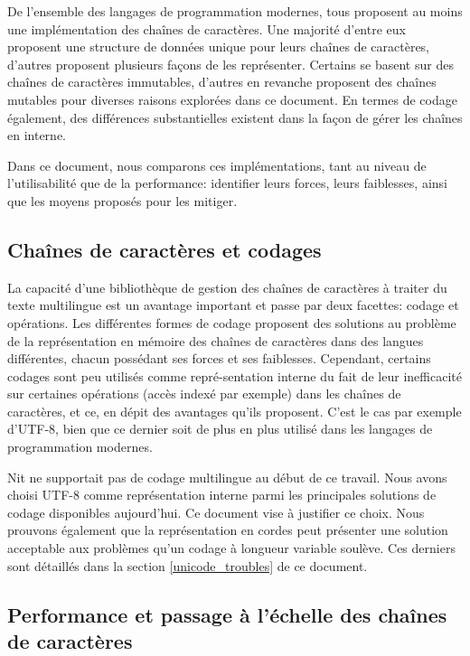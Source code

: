 \begin{introduction}
De l'ensemble des langages de programmation modernes, tous
proposent au moins une implémentation des chaînes de caractères.
Une majorité d'entre eux proposent une structure de données unique pour leurs
chaînes de caractères, d'autres proposent plusieurs façons de les
représenter.
Certains se basent sur des chaînes de caractères immutables,
d'autres en revanche proposent des chaînes mutables pour diverses raisons explorées
dans ce document.
En termes de codage également, des différences substantielles
existent dans la façon de gérer les chaînes en interne.

Dans ce document, nous comparons ces implémentations, tant au niveau de
l'utilisabilité que de la performance: identifier leurs forces,
leurs faiblesses, ainsi que les moyens proposés pour les mitiger.

\subsection{Chaînes de caractères et codages}

La capacité d'une bibliothèque de gestion des chaînes de caractères à traiter
du texte multilingue est un avantage important et passe par deux facettes:
codage et opérations.
Les différentes formes de codage proposent des solutions au problème
de la représentation en mémoire des chaînes de caractères dans des langues
différentes, chacun possédant ses forces et ses faiblesses.
Cependant, certains codages sont peu utilisés comme repré-sentation interne
du fait de leur inefficacité sur certaines opérations (accès indexé par exemple) dans
les chaînes de caractères, et ce, en dépit des avantages qu'ils proposent.
C'est le cas par exemple d'UTF-8, bien que ce dernier soit de plus en plus utilisé dans
les langages de programmation modernes.

Nit ne supportait pas de codage multilingue au début de ce travail.
Nous avons choisi UTF-8 comme représentation interne parmi
les principales solutions de codage disponibles aujourd'hui.
Ce document vise à justifier ce choix.
Nous prouvons également que la représentation en cordes peut
présenter une solution acceptable aux problèmes qu'un codage à longueur variable soulève.
Ces derniers sont détaillés dans la section \ref{unicode_troubles} de ce document.

\subsection{Performance et passage à l'échelle des chaînes de caractères}\label{intro_scaling}


\end{introduction}
